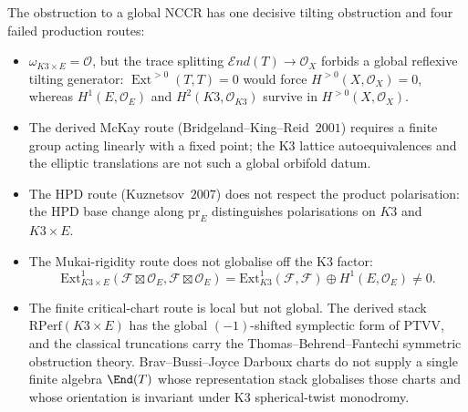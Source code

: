 \begin{proposition}
The obstruction to a global NCCR has one decisive tilting obstruction
and four failed production routes:
\begin{itemize}
\item[\textup{(a)}] $\omega_{K3 \times E} = \mathcal{O}$, but the trace splitting $\mathcal{E}nd(T)\to\mathcal O_X$ forbids a global reflexive tilting generator: $\operatorname{Ext}^{>0}(T,T)=0$ would force $H^{>0}(X,\mathcal O_X)=0$, whereas $H^1(E,\mathcal O_E)$ and $H^2(K3,\mathcal O_{K3})$ survive in $H^{>0}(X,\mathcal O_X)$.
\item[\textup{(b)}] The derived McKay route (Bridgeland--King--Reid~$2001$) requires a finite group acting linearly with a fixed point; the K3 lattice autoequivalences and the elliptic translations are not such a global orbifold datum.
\item[\textup{(c)}] The HPD route (Kuznetsov~$2007$) does not respect the product polarisation: the HPD base change along $\mathrm{pr}_E$ distinguishes polarisations on $K3$ and $K3 \times E$.
\item[\textup{(d)}] The Mukai-rigidity route does not globalise off the K3 factor:
\[
\mathrm{Ext}^1_{K3 \times E}(\mathcal{F} \boxtimes \mathcal{O}_E, \mathcal{F} \boxtimes \mathcal{O}_E)
= \mathrm{Ext}^1_{K3}(\mathcal{F}, \mathcal{F}) \oplus H^1(E, \mathcal{O}_E) \neq 0 .
\]
\item[\textup{(e)}] The finite critical-chart route is local but not global. The derived stack $\mathrm{RPerf}(K3\times E)$ has the global $(-1)$-shifted symplectic form of PTVV, and the classical truncations carry the Thomas--Behrend--Fantechi symmetric obstruction theory. Brav--Bussi--Joyce Darboux charts do not supply a single finite algebra $\End(T)$ whose representation stack globalises those charts and whose orientation is invariant under K3 spherical-twist monodromy.
\end{itemize}
\end{proposition}

